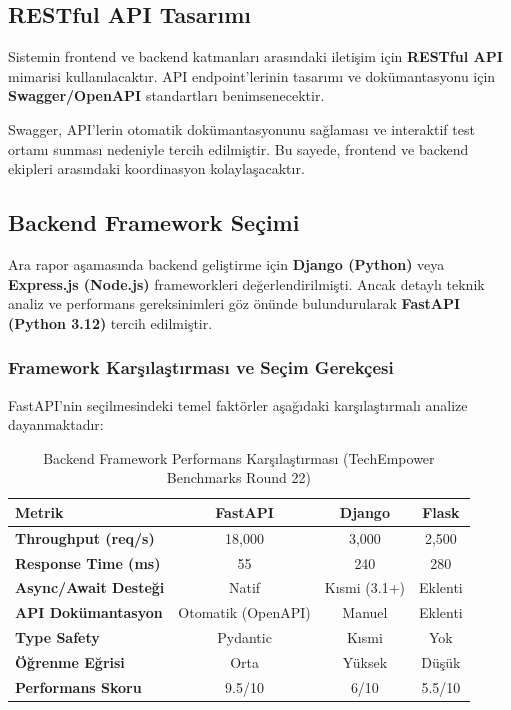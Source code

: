 \documentclass[a4paper,12pt]{report}
\begin{document}
\subsection{RESTful API Tasarımı}

Sistemin frontend ve backend katmanları arasındaki iletişim için \textbf{RESTful API} mimarisi kullanılacaktır. API endpoint'lerinin tasarımı ve dokümantasyonu için \textbf{Swagger/OpenAPI} standartları benimsenecektir.

Swagger, API'lerin otomatik dokümantasyonunu sağlaması ve interaktif test ortamı sunması nedeniyle tercih edilmiştir. Bu sayede, frontend ve backend ekipleri arasındaki koordinasyon kolaylaşacaktır.

\subsection{Backend Framework Seçimi}

Ara rapor aşamasında backend geliştirme için \textbf{Django (Python)} veya \textbf{Express.js (Node.js)} frameworkleri değerlendirilmişti. Ancak detaylı teknik analiz ve performans gereksinimleri göz önünde bulundurularak \textbf{FastAPI (Python 3.12)} tercih edilmiştir.

\subsubsection{Framework Karşılaştırması ve Seçim Gerekçesi}

FastAPI'nin seçilmesindeki temel faktörler aşağıdaki karşılaştırmalı analize dayanmaktadır:

\begin{table}[h]
\centering
\small
\begin{tabular}{|l|c|c|c|}
\hline
\textbf{Metrik} & \textbf{FastAPI} & \textbf{Django} & \textbf{Flask} \\ \hline
\textbf{Throughput (req/s)} & 18,000 & 3,000 & 2,500 \\ \hline
\textbf{Response Time (ms)} & 55 & 240 & 280 \\ \hline
\textbf{Async/Await Desteği} & Natif & Kısmi (3.1+) & Eklenti \\ \hline
\textbf{API Dokümantasyon} & Otomatik (OpenAPI) & Manuel & Eklenti \\ \hline
\textbf{Type Safety} & Pydantic & Kısmi & Yok \\ \hline
\textbf{Öğrenme Eğrisi} & Orta & Yüksek & Düşük \\ \hline
\textbf{Performans Skoru} & 9.5/10 & 6/10 & 5.5/10 \\ \hline
\end{tabular}
\caption{Backend Framework Performans Karşılaştırması (TechEmpower Benchmarks Round 22)}
\end{table}
\end{document}
